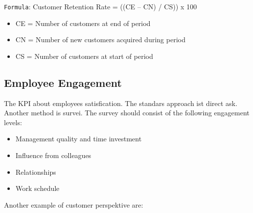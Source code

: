 \documentclass[]{book}
\providecommand{\tightlist}{%
  \setlength{\itemsep}{0pt}\setlength{\parskip}{0pt}}
\begin{document}
\texttt{Formula}: Customer Retention Rate = ((CE -- CN) / CS)) x 100

\begin{itemize}
\tightlist
\item
  CE = Number of customers at end of period
\item
  CN = Number of new customers acquired during period
\item
  CS = Number of customers at start of period
\end{itemize}

\subsection{Employee Engagement}\label{employee-engagement}

The KPI about employees satisfication. The standars approach ist direct
ask. Another method is survei. The survey should consist of the
following engagement levels:

\begin{itemize}
\tightlist
\item
  Management quality and time investment
\item
  Influence from colleagues
\item
  Relationships
\item
  Work schedule
\end{itemize}

Another example of customer perspektive are:
\end{document}
